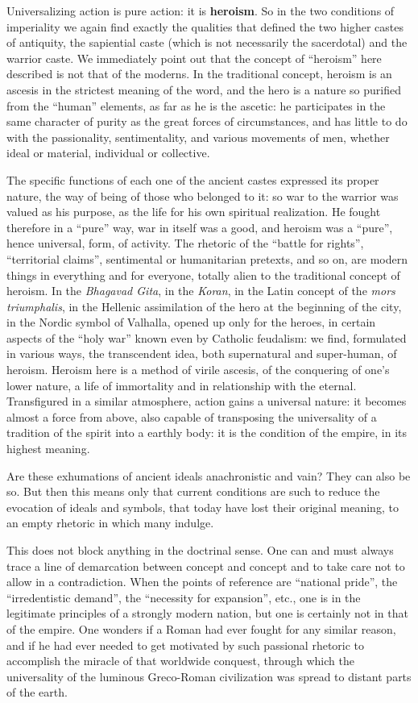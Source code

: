 Universalizing action is pure action: it is \textbf{heroism}. So in the two conditions of imperiality we again find exactly the qualities that defined the two higher castes of antiquity, the sapiential caste (which is not necessarily the sacerdotal) and the warrior caste. We immediately point out that the concept of ``heroism'' here described is not that of the moderns. In the traditional concept, heroism is an ascesis in the strictest meaning of the word, and the hero is a nature so purified from the ``human'' elements, as far as he is the ascetic: he participates in the same character of purity as the great forces of circumstances, and has little to do with the passionality, sentimentality, and various movements of men, whether ideal or material, individual or collective.

The specific functions of each one of the ancient castes expressed its proper nature, the way of being of those who belonged to it: so war to the warrior was valued as his purpose, as the life for his own spiritual realization. He fought therefore in a ``pure'' way, war in itself was a good, and heroism was a ``pure'', hence universal, form, of activity. The rhetoric of the ``battle for rights'', ``territorial claims'', sentimental or humanitarian pretexts, and so on, are modern things in everything and for everyone, totally alien to the traditional concept of heroism. In the \emph{Bhagavad Gita}, in the \emph{Koran}, in the Latin concept of the \emph{mors triumphalis}, in the Hellenic assimilation of the hero at the beginning of the city, in the Nordic symbol of Valhalla, opened up only for the heroes, in certain aspects of the ``holy war'' known even by Catholic feudalism: we find, formulated in various ways, the transcendent idea, both supernatural and super-human, of heroism. Heroism here is a method of virile ascesis, of the conquering of one's lower nature, a life of immortality and in relationship with the eternal. Transfigured in a similar atmosphere, action gains a universal nature: it becomes almost a force from above, also capable of transposing the universality of a tradition of the spirit into a earthly body: it is the condition of the empire, in its highest meaning.

Are these exhumations of ancient ideals anachronistic and vain? They can also be so. But then this means only that current conditions are such to reduce the evocation of ideals and symbols, that today have lost their original meaning, to an empty rhetoric in which many indulge.

This does not block anything in the doctrinal sense. One can and must always trace a line of demarcation between concept and concept and to take care not to allow in a contradiction. When the points of reference are ``national pride'', the ``irredentistic demand'', the ``necessity for expansion'', etc., one is in the legitimate principles of a strongly modern nation, but one is certainly not in that of the empire. One wonders if a Roman had ever fought for any similar reason, and if he had ever needed to get motivated by such passional rhetoric to accomplish the miracle of that worldwide conquest, through which the universality of the luminous Greco-Roman civilization was spread to distant parts of the earth.

